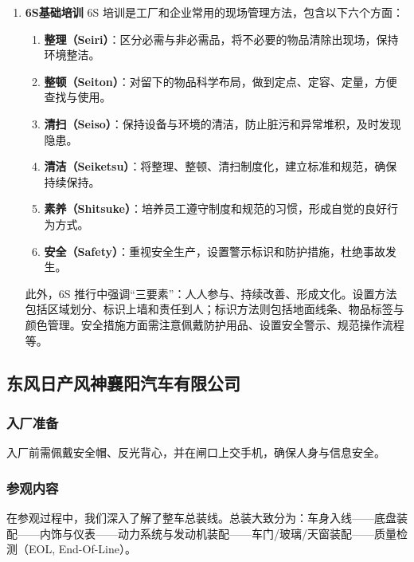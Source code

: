 \begin{enumerate}[label=\arabic*., labelindent=0pt, itemindent=2em, listparindent=0pt, left=1.5em]
\item \textbf{6S基础培训}
6S 培训是工厂和企业常用的现场管理方法，包含以下六个方面：
\begin{enumerate}
  \item \textbf{整理（Seiri）}：区分必需与非必需品，将不必要的物品清除出现场，保持环境整洁。
  \item \textbf{整顿（Seiton）}：对留下的物品科学布局，做到定点、定容、定量，方便查找与使用。
  \item \textbf{清扫（Seiso）}：保持设备与环境的清洁，防止脏污和异常堆积，及时发现隐患。
  \item \textbf{清洁（Seiketsu）}：将整理、整顿、清扫制度化，建立标准和规范，确保持续保持。
  \item \textbf{素养（Shitsuke）}：培养员工遵守制度和规范的习惯，形成自觉的良好行为方式。
  \item \textbf{安全（Safety）}：重视安全生产，设置警示标识和防护措施，杜绝事故发生。
\end{enumerate}
此外，6S 推行中强调“三要素”：人人参与、持续改善、形成文化。设置方法包括区域划分、标识上墙和责任到人；标识方法则包括地面线条、物品标签与颜色管理。安全措施方面需注意佩戴防护用品、设置安全警示、规范操作流程等。
\end{enumerate}


\subsection{东风日产风神襄阳汽车有限公司}
\subsubsection{入厂准备}
入厂前需佩戴安全帽、反光背心，并在闸口上交手机，确保人身与信息安全。

\subsubsection{参观内容}
在参观过程中，我们深入了解了整车总装线。总装大致分为：车身入线——底盘装配——内饰与仪表——动力系统与发动机装配——车门/玻璃/天窗装配——质量检测（EOL, End-Of-Line）。

